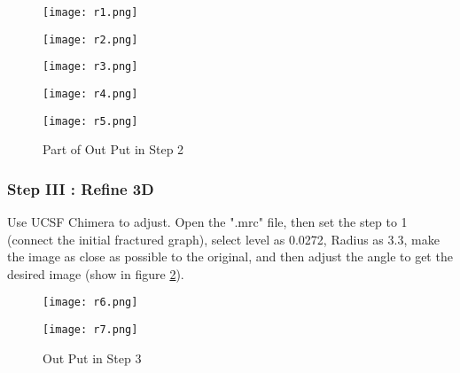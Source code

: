 \documentclass{mcmthesis}
\begin{document}
\begin{figure}[htbp]  
\caption{Part of Out Put in Step 2} \label{fig:Part of Out Put in Step 2}
\centering
\begin{minipage}[t]{0.15\textwidth}
\centering  
\texttt{[image: r1.png]} \\
\end{minipage}
\hspace{1ex}
\begin{minipage}[t]{0.15\textwidth}  
\centering  
\texttt{[image: r2.png]}\\
\end{minipage}  
\hspace{1ex}
\begin{minipage}[t]{0.15\textwidth}  
\centering  
\texttt{[image: r3.png]}\\
\end{minipage}  
\hspace{1ex}
\begin{minipage}[t]{0.15\textwidth}  
\centering  
\texttt{[image: r4.png]}\\
\end{minipage}  
\hspace{1ex}
\begin{minipage}[t]{0.15\textwidth}  
\centering  
\texttt{[image: r5.png]}\\
\end{minipage}  
\end{figure} 




\subsubsection{Step III : Refine 3D}

\par Use UCSF Chimera to adjust. Open the ".mrc" file, then set the step to 1 (connect the initial fractured graph), select level as 0.0272, Radius as 3.3, make the image as close as possible to the original, and then adjust the angle to get the desired image (show in figure \ref{fig:Out Put in Step 3}).


\begin{figure}[htbp]  
\caption{Out Put in Step 3} \label{fig:Out Put in Step 3}
\centering
\begin{minipage}[t]{0.45\textwidth}
\centering  
\texttt{[image: r6.png]} \\
\end{minipage}
\hspace{1ex}
\begin{minipage}[t]{0.45\textwidth}  
\centering  
\texttt{[image: r7.png]}\\
\end{minipage}  
\end{figure} 
\end{document}
